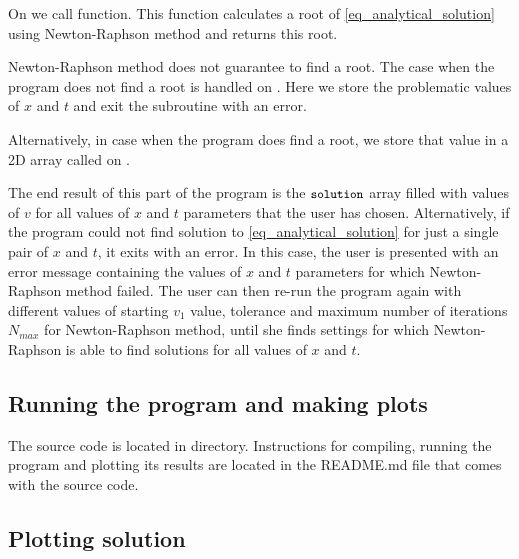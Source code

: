 On  we call  function. This function calculates a root of \autoref{eq_analytical_solution} using Newton-Raphson method and returns this root.

Newton-Raphson method does not guarantee to find a root. The case when the program does not find a root is handled on . Here we store the problematic values of $x$ and $t$ and exit the subroutine with an error.

Alternatively, in case when the program does find a root, we store that value in a 2D array called  on .

The end result of this part of the program is the $\texttt{\small solution}$ array filled with values of $v$ for all values of $x$ and $t$ parameters that the user has chosen. Alternatively, if the program could not find solution to \autoref{eq_analytical_solution} for just a single pair of $x$ and $t$, it exits with an error. In this case, the user is presented with an error message containing the values of $x$ and $t$ parameters for which Newton-Raphson method failed. The user can then re-run the program again with different values of starting $v_1$ value, tolerance and maximum number of iterations $N_{max}$ for Newton-Raphson method, until she finds settings for which Newton-Raphson is able to find solutions for all values of $x$ and $t$.



\subsection{Running the program and making plots}

The source code is located in  directory. Instructions for compiling, running the program and plotting its results are located in the README.md file that comes with the source code.


\subsection{Plotting solution}

